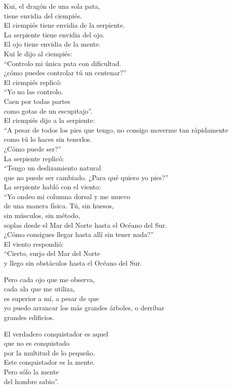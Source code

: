 \documentclass[book,b5paper,hidelinks,final]{memoir}
\begin{document}
	Kui, el dragón de una sola pata,\\
	tiene envidia del ciempiés.\\
	El ciempiés tiene envidia de la serpiente.\\
	La serpiente tiene envidia del ojo.\\
	El ojo tiene envidia de la mente.\\
	Kui le dijo al ciempiés:\\
	``Controlo mi única pata con dificultad.\\
	¿cómo puedes controlar tú un centenar?''\\
	El ciempiés replicó:\\
	``Yo no las controlo.\\
	Caen por todas partes\\
	como gotas de un escupitajo''.\\
	El ciempiés dijo a la serpiente:\\
	``A pesar de todos los pies que tengo, no consigo moverme tan
	rápidamente\\
	como tú lo haces sin tenerlos.\\
	¿Cómo puede ser?''\\
	La serpiente replicó:\\
	``Tengo un deslizamiento natural\\
	que no puede ser cambiado. ¿Para qué quiero yo pies?''\\
	La serpiente habló con el viento:\\
	``Yo ondeo mi columna dorsal y me muevo\\
	de una manera física. Tú, sin huesos,\\
	sin músculos, sin método,\\
	soplas desde el Mar del Norte hasta el Océano del Sur.\\
	¿Cómo consigues llegar hasta allí sin tener nada?''\\
	El viento respondió:\\
	``Cierto, surjo del Mar del Norte\\
	y llego sin obstáculos hasta el Océano del Sur.
	
	Pero cada ojo que me observa,\\
	cada ala que me utiliza,\\
	es superior a mí, a pesar de que\\
	yo puedo arrancar los más grandes árboles, o derribar\\
	grandes edificios.
	
	El verdadero conquistador es aquel\\
	que no es conquistado\\
	por la multitud de lo pequeño.\\
	Este conquistador es la mente.\\
	Pero sólo la mente\\
	del hombre sabio''.
	
\end{document}
